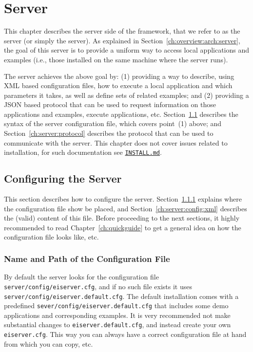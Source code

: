 {%
}
\chapter{\ei Server}
\label{ch:server}

This chapter describes the server side of the \ei framework, that we
refer to as the \ei server (or simply the server).
%
As explained in Section~\ref{ch:overview:arch:server}, the goal of
this server is to provide a uniform way to access local applications
and examples (i.e., those installed on the same machine where the
server runs).


The \ei server achieves the above goal by:
%
(1) providing a way to describe, using XML based configuration files,
how to execute a local application and which parameters it takes, as
well as define sets of related examples; and 
%
(2) providing a JSON based protocol that can be used to request
information on those applications and examples, execute applications,
etc.
%
Section~\ref{ch:server:config} describes the syntax of the server
configuration file, which covers point~(1) above; and
Section~\ref{ch:server:protocol} describes the protocol that can be
used to communicate with the server.
%
This chapter does not cover issues related to installation, for such
documentation see
\texttt{\href{http://github.com/abstools/easyinterface}{INSTALL.md}}.


\section{Configuring the \ei Server}
\label{ch:server:config}

This section describes how to configure the \ei server.
%
Section~\ref{ch:server:config:file} explains where the configuration
file show be placed, and Section~\ref{ch:server:config:xml} describes
the (valid) content of this file.
%
Before proceeding to the next sections, it highly recommended to read
Chapter~\ref{ch:quickguide} to get a general idea on how the
configuration file looks like, etc.


\subsection{Name and Path of the Configuration File}
\label{ch:server:config:file}

By default the server looks for the configuration file
\texttt{server/config/eiserver.cfg}, and if no such file exists it
uses \texttt{server/config/eiserver.default.cfg}.
%
The default installation comes with a predefined
\texttt{sever/config/eiserver.default.cfg} that includes some demo
applications and corresponding examples. It is very recommended not
make substantial changes to \texttt{eiserver.default.cfg}, and instead
create your own \texttt{eiserver.cfg}. This way you can always have a
correct configuration file at hand from which you can copy, etc.

